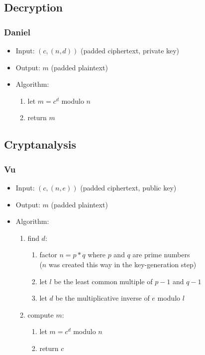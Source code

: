 
\subsection{Decryption}

\begin{frame}
\frametitle{Daniel}
\begin{itemize}
\item Input: $(c, (n, d))$ (padded ciphertext, private key)
\item Output: $m$ (padded plaintext)
\item Algorithm:
  \begin{enumerate}
  \item let $m = c^d$ modulo $n$
  \item return $m$
  \end{enumerate}
\end{itemize}
\end{frame}


\subsection{Cryptanalysis}

\begin{frame}
\frametitle{Vu}
\begin{itemize}
\item Input: $(c, (n, e))$ (padded ciphertext, public key)
\item Output: $m$ (padded plaintext)
\item Algorithm:
  \begin{enumerate}
  \item find $d$:
    \begin{enumerate}
    \item factor $n = p * q$ where
      $p$ and $q$ are prime numbers \\
      ($n$ was created this way in the key-generation step)
    \item let $l$ be the least common multiple of
      $p - 1$ and $q - 1$
    \item let $d$ be the multiplicative inverse of $e$
      modulo $l$
    \end{enumerate}
  \item compute $m$:
    \begin{enumerate}
    \item let $m = c^d$ modulo $n$
    \item return $c$
    \end{enumerate}
  \end{enumerate}
\end{itemize}
\end{frame}

